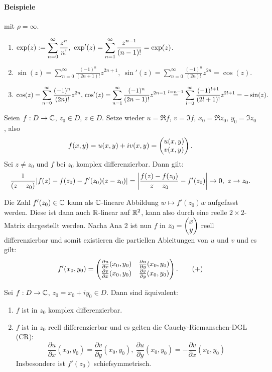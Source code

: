 \documentclass[a4paper,twoside,DIV15,BCOR12mm]{scrbook}
\begin{document}
\paragraph{Beispiele} mit $\rho = \infty$.\begin{enumerate}
\item $\displaystyle \exp(z) := \sum_{n=0}^\infty \frac{z^n}{n!},\ \exp'(z) = \sum_{n=1}^\infty \frac{z^{n-1}}{(n-1)!} = \exp(z)$.
\item $\displaystyle \sin(z) = \sum_{n=0}^\infty \frac{(-1)^n}{(2n+1)!}z^{2n+1},\ \sin'(z) = \sum_{n=0}^\infty \frac{(-1)^n}{(2n)!}z^{2n} = \cos(z).$
\item $\displaystyle \cos(z) = \sum_{n=0}^\infty \frac{(-1)^n}{(2n)!}z^{2n},\newline \cos'(z) = \sum_{n=1}^\infty \frac{(-1)^n}{(2n-1)!}z^{2n-1} \stackrel{l=n-1}{=} \sum_{l=0}^\infty \frac{(-1)^{l+1}}{(2l+1)!}z^{2l+1} = -\sin(z).$
\end{enumerate}


Seien $f:D\rightarrow\mathbb{C}$, $z_0\in D$, $z\in D$. Setze wieder $u = \Re f$, $v = \Im f$, $x_0 = \Re z_0$, $y_0 = \Im z_0$, also
\[f(x,y) = u(x,y) + iv(x,y) = \left(\!\!\!\begin{array}{c}u(x,y)\\v(x,y)\end{array}\!\!\!\right).\]
Sei $z\neq z_0$ und $f$ bei $z_0$ komplex differenzierbar. Dann gilt:
\[\frac{1}{(z-z_0)}|f(z)-f(z_0)-f'(z_0)(z-z_0)| = \left|\frac{f(z)-f(z_0)}{z-z_0} - f'(z_0)\right| \rightarrow 0,\ z\rightarrow z_0.\]

Die Zahl $f'(z_0)\in\mathbb{C}$ kann als $\mathbb{C}$-lineare Abbildung $w\mapsto f'(z_0)w$ aufgefasst werden. Diese ist dann auch $\mathbb{R}$-linear auf $\mathbb{R}^2$, kann also durch eine reelle $2\times 2$-Matrix dargestellt werden. Nacha Ana 2 ist nun $f$ in $z_0 = \left(\!\!\!\begin{array}{c}x\\y\end{array}\!\!\!\right)$ reell differenzierbar und somit existieren die partiellen Ableitungen von $u$ und $v$ und es gilt:
\[f'(x_0,y_0) = \left(\!\!\!\begin{array}{c c}\frac{\partial u}{\partial x} (x_0,y_0) & \frac{\partial u}{\partial y} (x_0,y_0)\\
\frac{\partial v}{\partial x} (x_0,y_0) & \frac{\partial v}{\partial y} (x_0,y_0)\end{array}\!\!\!\right).\tag{+}\]

\begin{satz} Sei $f:D\rightarrow\mathbb{C}$, $z_0 = x_0 + iy_0\in D$. Dann sind äquivalent:
\begin{enumerate}
\item $f$ ist in $z_0$ komplex differenzierbar.
\item $f$ ist in $z_0$ reell differenzierbar und es gelten die Cauchy-Riemanschen-DGL (CR):
\[\frac{\partial u}{\partial x} (x_0,y_0) = \frac{\partial v}{\partial y} (x_0,y_0),\ \frac{\partial u}{\partial y} (x_0,y_0) = -\frac{\partial v}{\partial x} (x_0,y_0)\]
Insbesondere ist $f'(z_0)$ schiefsymmetrisch.
\end{enumerate}
\end{satz}
\end{document}
